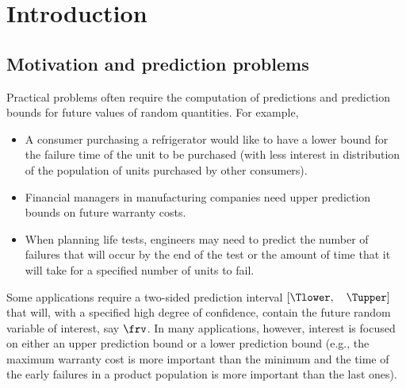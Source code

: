 \section{Introduction}
\subsection{Motivation and prediction problems}
Practical problems often require the computation of predictions
and prediction bounds for
future values of random quantities. For example,
\begin{itemize}
 \item 
A consumer purchasing a refrigerator would like to
have a lower bound for the failure time of the unit to be purchased (with
less interest in distribution of the population of units purchased by
other consumers).
\item 
Financial managers in manufacturing companies need
upper prediction bounds on future warranty costs. 	
\item 
When planning life tests, engineers may need to predict the number of
failures that will occur by the end of the test or the amount of time
that it will take for a specified number of units to fail.
\end{itemize}

Some applications require a two-sided prediction interval
$[\Tlower, \quad \Tupper]$ that will, with a specified high degree of
confidence, contain the future random variable of interest, say
$\frv$. In many applications, however, interest is focused on either
an upper prediction bound or a lower prediction bound (e.g., the
maximum warranty cost is more important than the minimum and the time
of the early failures in a product population is more important
than the last ones).


